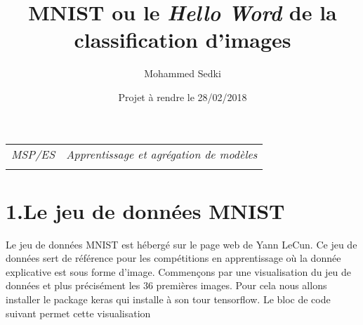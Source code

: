 \documentclass[11pt,]{article}
\title{MNIST ou le \emph{Hello Word} de la classification d'images}
\author{Mohammed Sedki}
\date{Projet à rendre le 28/02/2018}
\begin{document}
  

		\maketitle
		
	
		\thispagestyle{firststyle}



	\noindent \begin{tabular*}{\textwidth}{ @{\extracolsep{\fill}} lr @{\extracolsep{\fill}}}


\textit{MSP/ES} & \textit{Apprentissage et agrégation de modèles}\\
	&  \\
	\hline
	\end{tabular*}
	
\vspace{2mm}
	


\hypertarget{le-jeu-de-donnees-mnist}{%
\section{1.Le jeu de données MNIST}\label{le-jeu-de-donnees-mnist}}

Le jeu de données MNIST est hébergé sur le page web de Yann LeCun. Ce
jeu de données sert de référence pour les compétitions en apprentissage
où la donnée explicative est sous forme d'image. Commençons par une
visualisation du jeu de données et plus précisément les \(36\) premières
images. Pour cela nous allons installer le package \textsf{keras} qui
installe à son tour \textsf{tensorflow}. Le bloc de code suivant permet
cette visualisation
\end{document}
